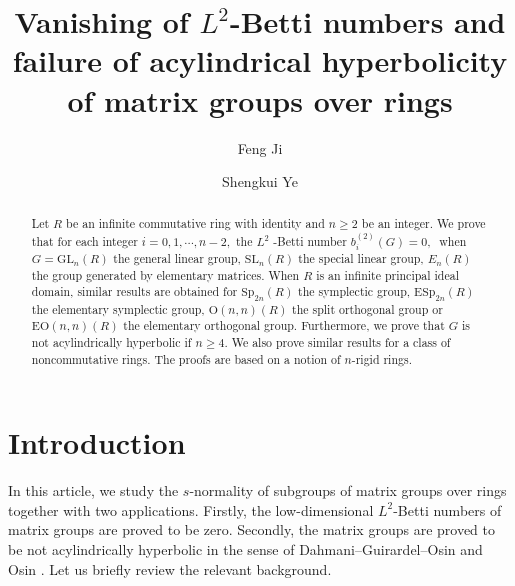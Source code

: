 \documentclass{gtpart}     %
\title{Vanishing of $L^{2}$-Betti numbers and failure of acylindrical
hyperbolicity of matrix groups over rings}
\author{Feng Ji}
\author{Shengkui Ye}
\begin{document}
\begin{abstract}
Let $R$ be an infinite commutative ring with identity and $n\geq 2$ be an
integer. We prove that for each integer $i=0,1,\cdots ,n-2,$ the $L^{2}$%
-Betti number $b_{i}^{(2)}(G)=0,$ $\ $when $G=\mathrm{GL}_{n}(R)$ the
general linear group, $\mathrm{SL}_{n}(R)$ the special linear group, $%
E_{n}(R)$ the group generated by elementary matrices. When $R$ is an
infinite principal ideal domain, similar results are obtained for $\mathrm{Sp%
}_{2n}(R)$ the symplectic group, $\mathrm{ESp}_{2n}(R)$ the elementary
symplectic group, $\mathrm{O}(n,n)(R)$ the split orthogonal group or $%
\mathrm{EO}(n,n)(R)$ the elementary orthogonal group. Furthermore, we prove
that $G$ is not acylindrically hyperbolic if $n\geq 4$. We also prove
similar results for a class of noncommutative rings. The proofs are based on
a notion of $n$-rigid rings.
\end{abstract}

\maketitle

\section{Introduction}

In this article, we study the $s$-normality of subgroups of matrix groups
over rings together with two applications. Firstly, the low-dimensional $%
L^{2}$-Betti numbers of matrix groups are proved to be zero. Secondly, the
matrix groups are proved to be not acylindrically hyperbolic in the sense of
Dahmani--Guirardel--Osin \cite{dgo} and Osin \cite{Os}. Let us briefly
review the relevant background.
\end{document}
